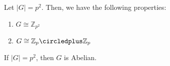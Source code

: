 \begin{theorem}
    Let \(|G| = p^2\). Then, we have the following properties:
    \begin{enumerate}
        \item \(G \cong \mathbb{Z}_{p^2}\)
        \item \(G \cong \mathbb{Z}_p \circledplus \mathbb{Z}_p\)
    \end{enumerate}
\end{theorem}

\begin{corollary}
    If \(|G| = p^2\), then \(G\) is Abelian.
\end{corollary}
